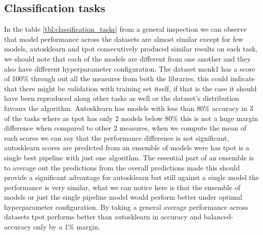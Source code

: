 \subsection{Classification tasks}
In the table \ref{tbl:classification_tasks} from a general inspection we can  observe that model performance across the datasets are almost similar except for few models, autosklearn and tpot consecutively produced similar results on each task, we should note that each of the models are different from one another and they also have different hyperparameter configuration. The dataset monk1 has a score of 100\% through out all the measures from both the libraries, this could indicate that there might be validation with training set itself, if that is the case it should have been reproduced along other tasks as well or the dataset's distribution favours the algorithm. Autosklearn has models with less than 80\% accuracy in 3 of the tasks where as  tpot has only 2 models below 80\% this is not a huge margin difference when compared to other 2 measures, when we compute the mean of each scores we can say that the performance difference is not significant, autosklearn scores are predicted from an ensemble of models were has tpot is a single best pipeline with just one algorithm. The essential part of an ensemble is to average out the predictions from the overall predictions made this should provide a significant advantage for autosklearn but still against a single model the performance is very similar, what we can notice here is that the ensemble of models or just the single pipeline model would perform better under optimal hyperparameter configuration. By taking a general average performance across datasets tpot performs better than autosklearn in accuracy and balanced-accuracy only by a 1\% margin.

